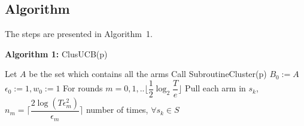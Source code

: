 \subsection*{Algorithm}

The steps are presented in Algorithm~1.\\%
\begin{algorithm}
\textbf{Algorithm 1:} ClusUCB(p)\\[-0.3cm]
\begin{algorithmic}[1]
\State Let $A$ be the set which contains all the arms
\State Call SubroutineCluster(p)
\State $B_{0}:=A$
\State $ \epsilon_{0}:=1, w_{0}:=1$
\State For rounds $m=0,1,..\big \lfloor \dfrac{1}{2}\log_{2} \dfrac{T}{e}\big\rfloor$
\State \hspace*{2em} Pull each arm in $s_{k}$, \newline\hspace*{2em}$n_{m}=\bigg\lceil\dfrac{2\log{(T\epsilon_{m}^{2})}}{\epsilon_{m}}\bigg\rceil$ number of times, $\forall s_{k}\in S$ 

\end{algorithmic}
\end{algorithm}

